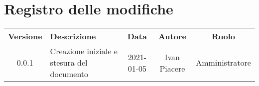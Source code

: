 \section*{Registro delle modifiche}

\begin{center}
	\begin{longtable}{|c|p{5cm}|c|c|c|}
	\hline
	\rowcolor{lighter-grayer}
	\textbf{Versione} & \textbf{Descrizione} & \textbf{Data} & \textbf{Autore} & \textbf{Ruolo} \\
	\hline
	\endfirsthead


	0.0.1 & Creazione iniziale e stesura del documento & 2021-01-05 & Ivan Piacere & Amministratore \\
	\hline
	\end{longtable}
\end{center}